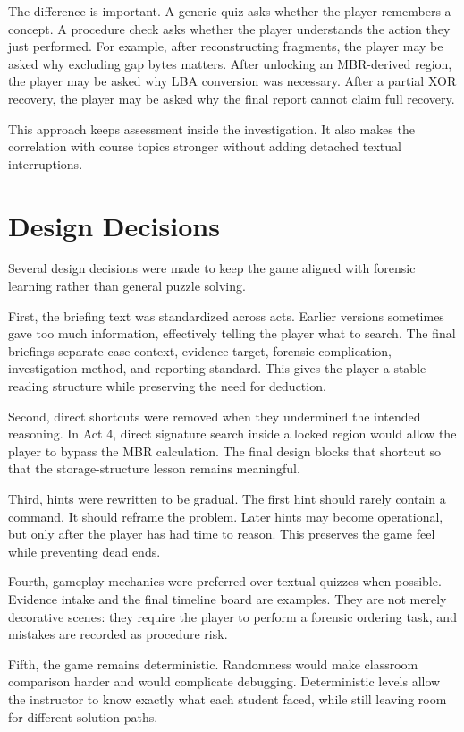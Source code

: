 \documentclass[11pt,a4paper]{article}
\begin{document}
The difference is important. A generic quiz asks whether the player remembers a concept. A procedure check asks whether the player understands the action they just performed. For example, after reconstructing fragments, the player may be asked why excluding gap bytes matters. After unlocking an MBR-derived region, the player may be asked why LBA conversion was necessary. After a partial XOR recovery, the player may be asked why the final report cannot claim full recovery.

This approach keeps assessment inside the investigation. It also makes the correlation with course topics stronger without adding detached textual interruptions.

\section{Design Decisions}

Several design decisions were made to keep the game aligned with forensic learning rather than general puzzle solving.

First, the briefing text was standardized across acts. Earlier versions sometimes gave too much information, effectively telling the player what to search. The final briefings separate case context, evidence target, forensic complication, investigation method, and reporting standard. This gives the player a stable reading structure while preserving the need for deduction.

Second, direct shortcuts were removed when they undermined the intended reasoning. In Act 4, direct signature search inside a locked region would allow the player to bypass the MBR calculation. The final design blocks that shortcut so that the storage-structure lesson remains meaningful.

Third, hints were rewritten to be gradual. The first hint should rarely contain a command. It should reframe the problem. Later hints may become operational, but only after the player has had time to reason. This preserves the game feel while preventing dead ends.

Fourth, gameplay mechanics were preferred over textual quizzes when possible. Evidence intake and the final timeline board are examples. They are not merely decorative scenes: they require the player to perform a forensic ordering task, and mistakes are recorded as procedure risk.

Fifth, the game remains deterministic. Randomness would make classroom comparison harder and would complicate debugging. Deterministic levels allow the instructor to know exactly what each student faced, while still leaving room for different solution paths.
\end{document}
